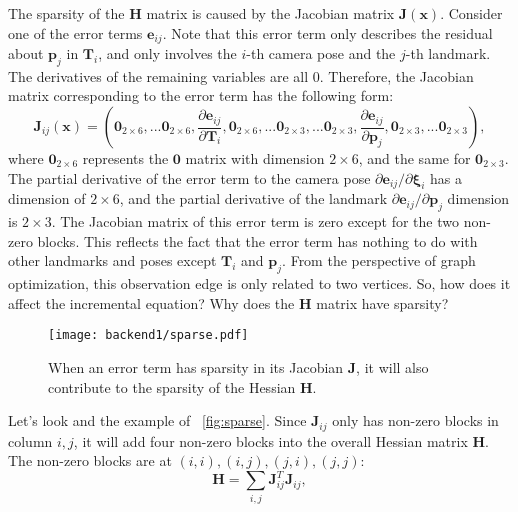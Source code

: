The sparsity of the $\mathbf{H}$ matrix is caused by the Jacobian matrix $\mathbf{J}(\mathbf{x})$. Consider one of the error terms $\mathbf{e}_{ij}$. Note that this error term only describes the residual about $\mathbf{p}_j$ in $\mathbf{T}_i$, and only involves the $i$-th camera pose and the $j$-th landmark. The derivatives of the remaining variables are all 0. Therefore, the Jacobian matrix corresponding to the error term has the following form:
\begin{equation}
	\mathbf{J}_{ij}(\mathbf{x}) = \left(
	\mathbf{0}_{2 \times 6},...
	\mathbf{0}_{2 \times 6},
	\frac{\partial \mathbf{e}_{ij}}{\partial \mathbf{T}_i},
	\mathbf{0}_{2 \times 6},...
	\mathbf{0}_{2 \times 3},...
	\mathbf{0}_{2 \times 3},
	\frac{\partial \mathbf{e}_{ij}}{ \partial \mathbf{p}_j},
	\mathbf{0}_{2 \times 3},...
	\mathbf{0}_{2 \times 3} 
	\right) ,
\end{equation}
where $\mathbf{0}_{2 \times 6}$ represents the $\mathbf{0}$ matrix with dimension $2 \times 6$, and the same for $\mathbf{0}_{2 \times 3}$. The partial derivative of the error term to the camera pose ${\partial \mathbf{e}_{ij}}/{\partial \mathbf{\xi}_i}$ has a dimension of $2 \times 6$, and the partial derivative of the landmark ${\partial \mathbf{e}_{ij}}/{\partial \mathbf{p}_j}$ dimension is $2 \times 3$. The Jacobian matrix of this error term is zero except for the two non-zero blocks. This reflects the fact that the error term has nothing to do with other landmarks and poses except $\mathbf{T}_i$ and $\mathbf{p}_j$. From the perspective of graph optimization, this observation edge is only related to two vertices. So, how does it affect the incremental equation? Why does the $\mathbf{H}$ matrix have sparsity?

\begin{figure}[!htp]
	\centering
	\texttt{[image: backend1/sparse.pdf]}
	\caption{When an error term has sparsity in its Jacobian $\mathbf{J}$, it will also contribute to the sparsity of the Hessian $\mathbf{H}$.}
	\label{fig:sparse}
\end{figure}

Let's look and the example of ~\autoref{fig:sparse}. Since $\mathbf{J}_{ij}$ only has non-zero blocks in column $i, j$, it will add four non-zero blocks into the overall Hessian matrix $\mathbf{H}$. The non-zero blocks are at $(i,i), (i,j), (j,i), (j,j)$: 
\begin{equation}
	\mathbf{H} = \sum_{i,j} \mathbf{J}_{ij}^T \mathbf{J}_{ij},
\end{equation}

